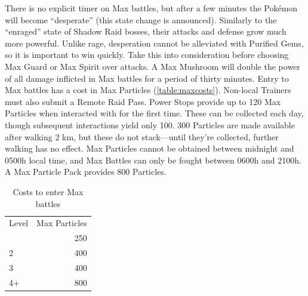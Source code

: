 There is no explicit timer on Max battles, but after a few minutes the Pokémon
  will become ``desperate'' (this state change is announced).
Similarly to the ``enraged'' state of Shadow Raid bosses, their attacks and
  defense grow much more powerful.
Unlike rage, desperation cannot be alleviated with Purified Gems, so it
  is important to win quickly.
Take this into consideration before choosing Max Guard or Max Spirit over attacks.
A Max Mushroom will double the power of all damage inflicted in
  Max battles for a period of thirty minutes.
Entry to Max battles has a cost in Max Particles (\autoref{table:maxcosts}).
Non-local Trainers must also submit a Remote Raid Pass.
Power Stops provide up to 120 Max Particles when interacted with for the first time.
These can be collected each day, though subsequent interactions yield only 100.
300 Particles are made available after walking 2 km, but these do not stack---until
 they're collected, further walking has no effect.
Max Particles cannot be obtained between midnight and 0500h local time,
  and Max Battles can only be fought between 0600h and 2100h.
A Max Particle Pack provides 800 Particles.
\begin{table}
\centering
\begin{tabular}{lr}
Level & Max Particles\\
\Midrule
  1 & 250\\
  2 & 400\\
  3 & 400\\
  4+ & 800\\
\end{tabular}
\caption{Costs to enter Max battles}
\label{table:maxcosts}
\end{table}
